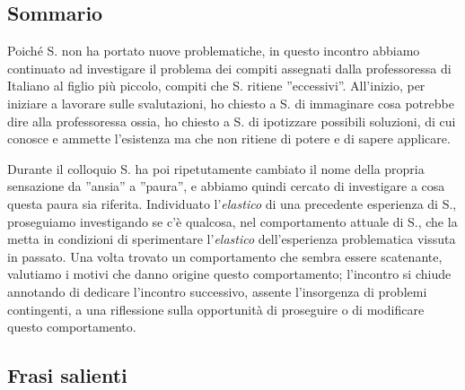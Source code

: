 \subsection*{Sommario}
Poiché S. non ha portato nuove problematiche, in questo incontro abbiamo continuato ad investigare il problema dei compiti assegnati dalla professoressa di Italiano al figlio più piccolo, compiti che S. ritiene ''eccessivi''.
All'inizio, per iniziare a lavorare sulle svalutazioni, ho chiesto a S. di immaginare cosa potrebbe dire alla professoressa ossia, ho chiesto a S. di ipotizzare possibili soluzioni, di cui conosce e ammette l'esistenza ma che non ritiene di potere e di sapere applicare.

Durante il colloquio S. ha poi ripetutamente cambiato il nome della propria sensazione da ''ansia'' a ''paura'', e abbiamo quindi cercato di investigare a cosa questa paura sia riferita. Individuato  l'\emph{elastico} di una precedente esperienza di S., proseguiamo investigando se c'è qualcosa, nel comportamento attuale di S., che la metta in condizioni di sperimentare l'\emph{elastico} dell'esperienza problematica vissuta in passato. Una volta trovato un comportamento che sembra essere scatenante, valutiamo i motivi che danno origine questo comportamento; l'incontro si chiude annotando di dedicare l'incontro successivo, assente l'insorgenza di problemi contingenti, a una riflessione sulla opportunità di proseguire o di modificare questo comportamento.

\subsection*{Frasi salienti}

